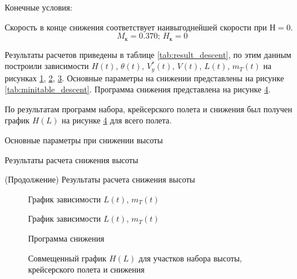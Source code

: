 Конечные условия:

Скорость в конце снижения соответствует наивыгоднейшей скорости при $Н=0$.
\[
    M_к = 0.370;\, H_к = 0
\]

Результаты расчетов приведены в таблице \ref{tab:result_descent}, по этим
данным построили зависимости $H(t)$, $\theta(t)$, $V_y^*(t)$, $V(t)$,
$L(t)$, $m_T(t)$ на рисунках \ref{fig:param_des}, \ref{fig:L_t_des},
\ref{fig:H_M_des}. Основные параметры на снижении представлены на рисунке
\ref{tab:minitable_descent}. Программа снижения представлена на рисунке
\ref{fig:H_L}.

По результатам программ набора, крейсерского полета и снижения был получен график
$H(L)$ на рисунке \ref{fig:H_L} для всего полета.

\begin{table}[H]
    \caption{Основные параметры при снижении высоты}
    \centering
    
    \label{tab:minitable_descent}
\end{table}

\begin{sidewaystable}[ph!]
    \centering
    \caption{Результаты расчета снижения высоты}
    \label{tab:result_descent}
    
    \centering
    \addtocounter{table}{-1}
    \addtocounter{totaltables}{-1}
    \caption{(Продолжение) Результаты расчета снижения высоты}
    
\end{sidewaystable}
\newpage

\begin{figure}[H]
\centering
\resizebox{.79\linewidth}{!}{}
\caption{График зависимости $L(t)$, $m_{T}(t)$}
\label{fig:param_des}
\end{figure}

\begin{figure}[H]
\centering
\resizebox{.79\linewidth}{!}{}
\caption{График зависимости $L(t)$, $m_{T}(t)$}
\label{fig:L_t_des}
\end{figure}
 
\begin{figure}[H]
\centering
\resizebox{.79\linewidth}{!}{}
\caption{Программа снижения}
\label{fig:H_M_des}
\end{figure}

\begin{figure}[H]
\centering
\resizebox{.79\linewidth}{!}{}
\caption{Совмещенный график $H(L)$ для участков набора высоты, крейсерского полета и снижения}
\label{fig:H_L}
\end{figure}

